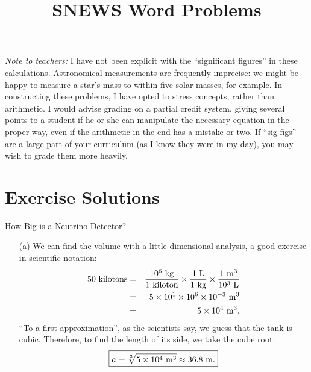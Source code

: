 \documentclass[12pt]{article}
\begin{document}
\title{SNEWS Word Problems}
\author{}
\date{}
\maketitle

{\em Note to teachers:}  I have not been explicit with the
``significant figures'' in these calculations.  Astronomical
measurements are frequently imprecise:  we might be happy to measure a
star's mass to within five solar masses, for example.  In constructing
these problems, I have opted to stress concepts, rather than
arithmetic.  I would advise grading on a partial credit system, giving
several points to a student if he or she can manipulate the necessary
equation in the proper way, even if the arithmetic in the end has a
mistake or two.  If ``sig figs'' are a large part of your curriculum
(as I know they were in my day), you may wish to grade them more heavily.

\section{Exercise Solutions}

\begin{probdesc}{1}{How Big is a Neutrino Detector?}

\begin{enumerate}
\item[(a)] 
We can find the volume with a little dimensional analysis, a good
exercise in scientific notation:
\begin{eqnarray}
50{\rm\ kilotons} &=& \frac{10^6 {\rm\ kg}}{1 {\rm\ kiloton}}
  \times \frac{1 {\rm\ L}}{1 {\rm\ kg}}
  \times \frac{1 {\rm\ m}^3}{10^3 {\rm\ L}} \nonumber\\
&=& 5 \times 10^1 \times 10^6 \times 10^{-3} {\rm\ m}^3 \nonumber\\
&=& 5 \times 10^4 {\rm\ m}^3.\nonumber
\end{eqnarray}
``To a first approximation'', as the scientists say, we guess that the
tank is cubic.  Therefore, to find the length of its side, we take the
cube root:
\begin{equation}
\boxed{a = \sqrt[3]{5\times10^4 {\rm\ m}^3} \approx 36.8 {\rm\ m}.}
\end{equation}

\end{enumerate}

\end{probdesc}
\end{document}
